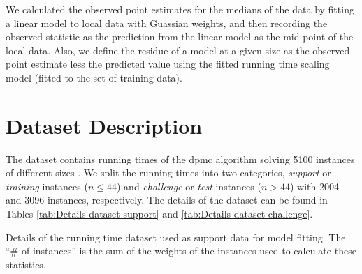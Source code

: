 We calculated the observed point estimates for the medians of the
data by fitting a linear model to local data with Guassian weights, and
then recording the observed statistic as the prediction from the linear
model as the mid-point of the local data.
Also, we define the residue of a model at a given size as the observed
point estimate less the
predicted value using the fitted running time scaling model (fitted to
the set of training data).


\section{Dataset Description}

The dataset contains running times of the dpmc algorithm solving
5100 instances of different sizes . We split the
running times into two categories, \emph{support} or \emph{training}
instances ($n\leq44$) and \emph{challenge} or
\emph{test} instances ($n>44$) with 2004
and 3096 instances, respectively. The
details of the dataset can be found in Tables \ref{tab:Details-dataset-support}
and \ref{tab:Details-dataset-challenge}.
\begin{table*}
\noindent \begin{centering}

\par\end{centering}

\caption{\label{tab:Details-dataset-support} Details of the running time
dataset used as support data for model fitting.
 The ``\# of instances'' is the
sum of the weights of the instances used to calculate these statistics.}
\end{table*}


